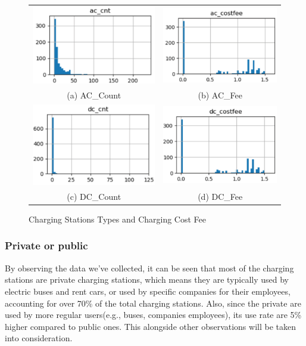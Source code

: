 \begin{figure}[!htbp]
	\begin{tabular}{cc}
		\includegraphics[width=0.45\columnwidth]{./figures/ac_cnt.pdf} &  \includegraphics[width=0.45\columnwidth]{./figures/ac_fee.pdf} \\
		(a) AC\_Count & (b) AC\_Fee \\[6pt] 
		\includegraphics[width=0.45\columnwidth]{./figures/dc_cnt.pdf} &
		\includegraphics[width=0.45\columnwidth]{./figures/dc_fee.pdf} \\
		(c) DC\_Count & (d) DC\_Fee
	\end{tabular}
	\centering
	\caption{Charging Stations Types and Charging Cost Fee}
	\label{fig5}
\end{figure}

\subsubsection{Private or public}
By observing the data we've collected, it can be seen that most of the charging stations are private charging stations, which means they are typically used by electric buses and rent cars, or used by specific companies for their employees, accounting for over 70\% of the total charging stations. Also, since the private are used by more regular users(e.g., buses, companies employees), its use rate are 5\% higher compared to public ones. This alongside other observations will be taken into consideration.


